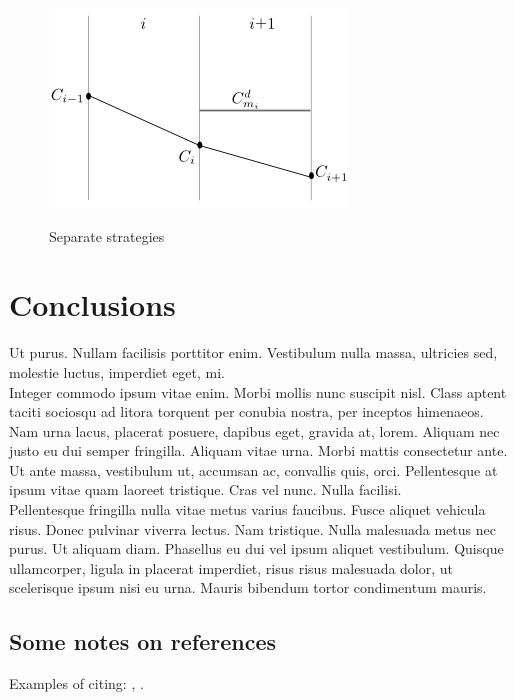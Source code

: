 \documentclass{tewiart}
\begin{document}
\begin{figure}[h]
\begin{minipage}{.49\linewidth}
\label{cztero}
\end{minipage}
\begin{minipage}{.49\linewidth}
\centering 
\includegraphics[width=\textwidth]{rysunek2d.png}
\label{mansard}
\end{minipage}
\caption{Separate strategies}
\end{figure}
\FloatBarrier


\section{Conclusions}
Ut purus. Nullam facilisis porttitor enim. Vestibulum nulla massa, ultricies
sed, molestie luctus, imperdiet eget, mi. \\
\indent Integer commodo ipsum vitae enim. Morbi mollis nunc suscipit nisl.
Class aptent taciti sociosqu ad litora torquent per conubia nostra, per
inceptos himenaeos. Nam urna lacus, placerat posuere, dapibus eget, gravida
at, lorem. Aliquam nec justo eu dui semper fringilla. Aliquam vitae urna.
Morbi mattis consectetur ante. Ut ante massa, vestibulum ut, accumsan ac,
convallis quis, orci. Pellentesque at ipsum vitae quam laoreet tristique. Cras
vel nunc. Nulla facilisi.\\
\indent Pellentesque fringilla nulla vitae metus varius faucibus. Fusce aliquet
vehicula risus. Donec pulvinar viverra lectus. Nam tristique. Nulla malesuada
metus nec purus. Ut aliquam diam. Phasellus eu dui vel ipsum aliquet
vestibulum. Quisque ullamcorper, ligula in placerat imperdiet, risus risus
malesuada dolor, ut scelerisque ipsum nisi eu urna. Mauris bibendum tortor
condimentum mauris.  


\subsection{Some notes on references}\label{bib}
Examples of citing: \cite{wilinski09}, \cite{wilinski09,
tian02, satchwell05}. 




\end{document}
